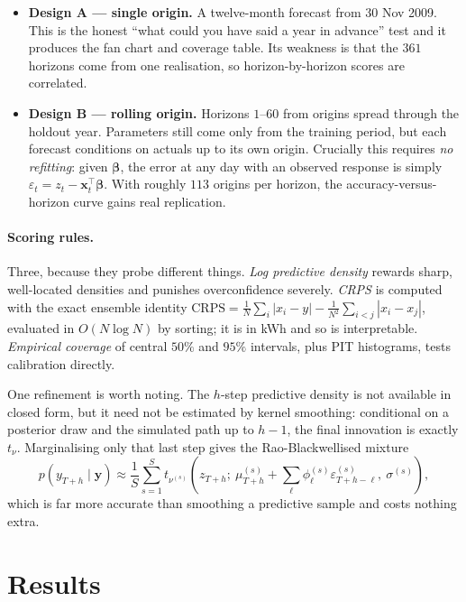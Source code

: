 \documentclass[11pt]{article}
\begin{document}
\begin{itemize}
\item \textbf{Design A --- single origin.} A twelve-month forecast from
30 Nov 2009. This is the honest ``what could you have said a year in advance''
test and it produces the fan chart and coverage table. Its weakness is that the
$361$ horizons come from one realisation, so horizon-by-horizon scores are
correlated.
\item \textbf{Design B --- rolling origin.} Horizons $1$--$60$ from origins
spread through the holdout year. Parameters still come only from the training
period, but each forecast conditions on actuals up to its own origin. Crucially
this requires \emph{no refitting}: given $\boldsymbol\beta$, the error at any
day with an observed response is simply $\varepsilon_t = z_t - \mathbf{x}_t^{\top}\boldsymbol\beta$.
With roughly $113$ origins per horizon, the accuracy-versus-horizon curve gains
real replication.
\end{itemize}

\paragraph{Scoring rules.} Three, because they probe different things.
\emph{Log predictive density} rewards sharp, well-located densities and
punishes overconfidence severely. \emph{CRPS} is computed with the exact
ensemble identity
$\mathrm{CRPS} = \frac{1}{N}\sum_i|x_i - y| - \frac{1}{N^2}\sum_{i<j}|x_i-x_j|$,
evaluated in $O(N\log N)$ by sorting; it is in kWh and so is interpretable.
\emph{Empirical coverage} of central $50\%$ and $95\%$ intervals, plus PIT
histograms, tests calibration directly.

One refinement is worth noting. The $h$-step predictive density is not
available in closed form, but it need not be estimated by kernel smoothing:
conditional on a posterior draw and the simulated path up to $h-1$, the final
innovation is exactly $t_\nu$. Marginalising only that last step gives the
Rao-Blackwellised mixture
\begin{equation}
p(y_{T+h}\mid \mathbf{y}) \approx \frac{1}{S}\sum_{s=1}^{S}
 t_{\nu^{(s)}}\!\left(z_{T+h};\ \mu^{(s)}_{T+h} + \textstyle\sum_\ell \phi^{(s)}_\ell \varepsilon^{(s)}_{T+h-\ell},\ \sigma^{(s)}\right),
\end{equation}
which is far more accurate than smoothing a predictive sample and costs nothing
extra.

\section{Results}
\end{document}
